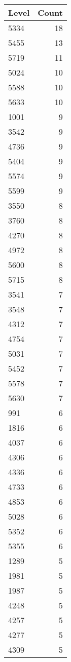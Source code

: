 \begin{table}[ht]
\centering
\begin{tabular}{lr}
  \hline
Level & Count \\ 
  \hline
5334 &  18 \\ 
  5455 &  13 \\ 
  5719 &  11 \\ 
  5024 &  10 \\ 
  5588 &  10 \\ 
  5633 &  10 \\ 
  1001 &   9 \\ 
  3542 &   9 \\ 
  4736 &   9 \\ 
  5404 &   9 \\ 
  5574 &   9 \\ 
  5599 &   9 \\ 
  3550 &   8 \\ 
  3760 &   8 \\ 
  4270 &   8 \\ 
  4972 &   8 \\ 
  5600 &   8 \\ 
  5715 &   8 \\ 
  3541 &   7 \\ 
  3548 &   7 \\ 
  4312 &   7 \\ 
  4754 &   7 \\ 
  5031 &   7 \\ 
  5452 &   7 \\ 
  5578 &   7 \\ 
  5630 &   7 \\ 
  991 &   6 \\ 
  1816 &   6 \\ 
  4037 &   6 \\ 
  4306 &   6 \\ 
  4336 &   6 \\ 
  4733 &   6 \\ 
  4853 &   6 \\ 
  5028 &   6 \\ 
  5352 &   6 \\ 
  5355 &   6 \\ 
  1289 &   5 \\ 
  1981 &   5 \\ 
  1987 &   5 \\ 
  4248 &   5 \\ 
  4257 &   5 \\ 
  4277 &   5 \\ 
  4309 &   5 \\ 

\end{tabular}
\end{table}
